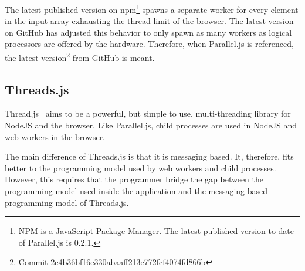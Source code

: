 The latest published version on npm\footnote{NPM is a JavaScript Package Manager. The latest published version to date of Parallel.js is 0.2.1.} spawns a separate worker for every element in the input array exhausting the thread limit of the browser. The latest version on GitHub has adjusted this behavior to only spawn as many workers as logical processors are offered by the hardware. Therefore, when Parallel.js is referenced, the latest version\footnote{Commit 2e4b36bf16e330abaaff213e772fcf4074fd866b} from GitHub is meant.

\subsection{Threads.js}
Thread.js~\cite{Wermke2016} aims to be a powerful, but simple to use, multi-threading library for NodeJS and the browser. Like Parallel.js, child processes are used in NodeJS and web workers in the browser.

The main difference of Threads.js is that it is messaging based. It, therefore, fits better to the programming model used by web workers and child processes. However, this requires that the programmer bridge the gap between the programming model used inside the application and the messaging based programming model of Threads.js.